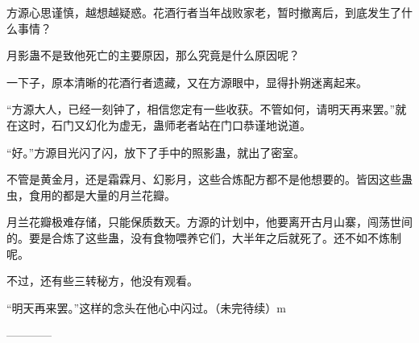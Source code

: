 \begin{this_body}
方源心思谨慎，越想越疑惑。花酒行者当年战败家老，暂时撤离后，到底发生了什么事情？

月影蛊不是致他死亡的主要原因，那么究竟是什么原因呢？

一下子，原本清晰的花酒行者遗藏，又在方源眼中，显得扑朔迷离起来。

“方源大人，已经一刻钟了，相信您定有一些收获。不管如何，请明天再来罢。”就在这时，石门又幻化为虚无，蛊师老者站在门口恭谨地说道。

“好。”方源目光闪了闪，放下了手中的照影蛊，就出了密室。

不管是黄金月，还是霜霖月、幻影月，这些合炼配方都不是他想要的。皆因这些蛊虫，食用的都是大量的月兰花瓣。

月兰花瓣极难存储，只能保质数天。方源的计划中，他要离开古月山寨，闯荡世间的。要是合炼了这些蛊，没有食物喂养它们，大半年之后就死了。还不如不炼制呢。

不过，还有些三转秘方，他没有观看。

“明天再来罢。”这样的念头在他心中闪过。（未完待续）m

------------

\end{this_body}

